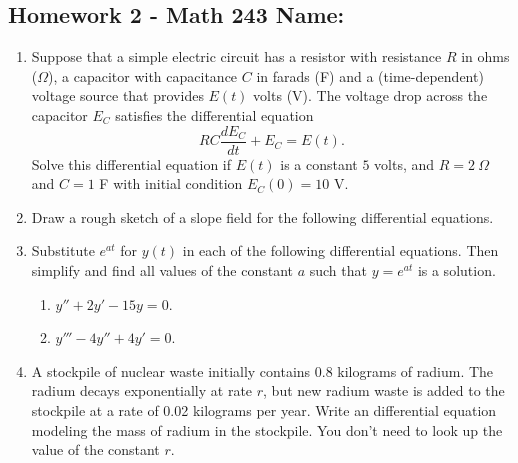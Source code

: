 \documentclass[10pt]{article}
\begin{document}
\pagestyle{empty}
\subsection*{Homework 2 - Math 243 \hfill Name: \underline{\hspace*{2in}}}

\noindent

\begin{enumerate}
\item Suppose that a simple electric circuit has a resistor with resistance $R$ in ohms ($\Omega$), a capacitor with capacitance $C$ in farads (F) and a (time-dependent) voltage source that provides $E(t)$ volts (V).  The voltage drop across the capacitor $E_C$ satisfies the differential equation
$$RC \dfrac{dE_C}{dt} + E_C = E(t).$$
Solve this differential equation if $E(t)$ is a constant $5$ volts, and $R = 2~\Omega$ and $C = 1$ F with initial condition $E_C(0) = 10$ V. 
\vfill

\item Draw a rough sketch of a slope field for the following differential equations. 
\begin{center}
\end{center}

\vfill

\item Substitute $e^{at}$ for $y(t)$ in each of the following differential equations.  Then simplify and find all values of the constant $a$ such that $y = e^{at}$ is a solution. 
\begin{enumerate}
\item $y'' + 2y' - 15y = 0$.
\vfill
\item $y''' - 4 y'' + 4 y' = 0$.
\vfill
\end{enumerate}


\item A stockpile of nuclear waste initially contains 0.8 kilograms of radium. The radium decays exponentially at rate $r$, but new radium waste is added to the stockpile at a rate of 0.02 kilograms per year. Write an differential equation modeling the mass of radium in the stockpile. You don't need to look up the value of the constant $r$. 
\vfill



\newpage
\setcounter{enumCount}{\theenumi}
\end{enumerate}
\end{document}
